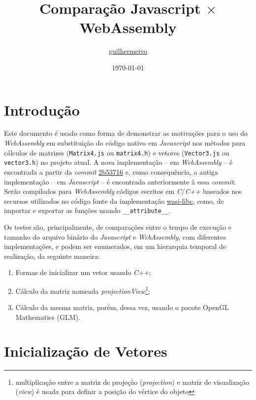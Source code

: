 \documentclass{article}
\title{Comparação Javascript $\boldsymbol{\times}$  WebAssembly}
\author{\href{https://github.com/guilhermeivo}{guilhermeivo}}
\date{\today}
\begin{document}
\maketitle


\section*{Introdução}

Este documento é usado como forma de demonstrar as motivações para o uso do \textit{WebAssembly}\cite{wasi} em substituição do código nativo em \textit{Javascript} nos métodos para cálculos de matrizes (\verb|Matrix4.js| ou \verb|matrix4.h|) e vetores (\verb|Vector3.js| ou \verb|vector3.h|) no projeto atual. A nova implementação -- em \textit{WebAssembly} -- é encontrada a partir da \textit{commit} \href{https://github.com/guilhermeivo/guilhermeivo.github.io/commit/2b537169b3fdd6d0d027cc9d810aac9471eb477e}{2b53716} e, como consequência, a antiga implementação -- em \textit{Javascript} -- é encontrada anteriormente à essa \textit{commit}. Serão compilados para \textit{WebAssembly} códigos escritos em \textit{C}/\textit{C++} baseados nos recursos utilizados no código fonte da implementação \href{https://github.com/WebAssembly/wasi-libc}{wasi-libc}, como, de importar e exportar as funções usando \verb|__attribute__|.

Os testes são, principalmente, de comparações entre o tempo de execução e tamanho do arquivo binário do \textit{Javascript} e \textit{WebAssembly}, com diferentes implementações, e podem ser enumerados, em um hierarquia temporal de realização, da seguinte maneira:

\begin{enumerate}
    \item Formas de inicializar um vetor usando \textit{C++};
    \item Cálculo da matriz nomeada \textit{projectionView}\footnote{multiplicação entre a matriz de projeção (\textit{projection}) e matriz de visualização (\textit{view}) é usada para definir a posição do vértice do objeto};
    \item Cálculo da mesma matriz, porém, dessa vez, usando o pacote OpenGL Mathematics (GLM)\cite{glm}.
\end{enumerate}

\section*{Inicialização de Vetores}
\end{document}
